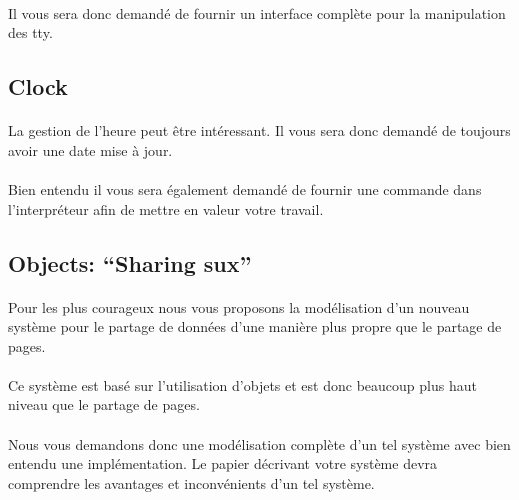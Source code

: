 \documentclass[10pt,a4wide]{article}
\begin{document}
\paragraph{}

Il vous sera donc demand\'e de fournir un interface compl\`ete pour la
manipulation des tty.

\subsection{Clock}

\paragraph{}

La gestion de l'heure peut \^etre int\'eressant. Il vous sera donc
demand\'e de toujours avoir une date mise \`a jour.

\paragraph{}

Bien entendu il vous sera \'egalement demand\'e de fournir une commande
dans l'interpr\'eteur afin de mettre en valeur votre travail.

\subsection{Objects: ``Sharing sux''}

\paragraph{}

Pour les plus courageux nous vous proposons la mod\'elisation d'un nouveau
syst\`eme pour le partage de donn\'ees d'une mani\`ere plus propre que
le partage de pages.

\paragraph{}

Ce syst\`eme est bas\'e sur l'utilisation d'objets et est donc beaucoup
plus haut niveau que le partage de pages.

\paragraph{}

Nous vous demandons donc une mod\'elisation compl\`ete d'un tel syst\`eme
avec bien entendu une impl\'ementation. Le papier d\'ecrivant votre
syst\`eme devra comprendre les avantages et inconv\'enients d'un tel
syst\`eme.
\end{document}
